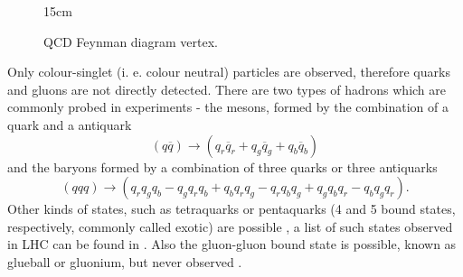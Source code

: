 \begin{figure}[!htm]{15cm} %
\caption{QCD Feynman diagram vertex.}%
\label{fig:QCDvertex}
\end{figure}

Only colour-singlet (i. e. colour neutral) particles are observed, therefore quarks and gluons are not directly detected. There are two types of hadrons which are commonly probed in experiments - the mesons, formed by the combination of a quark and a antiquark
\begin{equation}
    (q\overline q) \rightarrow (q_r \overline q_r + q_g \overline q_g + q_b \overline q_b)
\end{equation}
and the baryons formed by a combination of three quarks or three antiquarks
\begin{equation}
    (qqq) \rightarrow (q_r q_g q_b - q_g q_r q_b + q_b q_r q_g - q_r q_b q_g + q_g q_b q_r - q_b q_g q_r).
\end{equation}
Other kinds of states, such as tetraquarks or pentaquarks (4 and 5 bound states, respectively, commonly called exotic) are possible \cite{Gell-Mann:1964ewy, Zweig:1964jf}, a list of such states observed in LHC can be found in \cite{LHCb-FIGURE-2021-001-report}. Also the gluon-gluon bound state is possible, known as glueball or gluonium, but never observed \cite{Mathieu:2008me}. 

